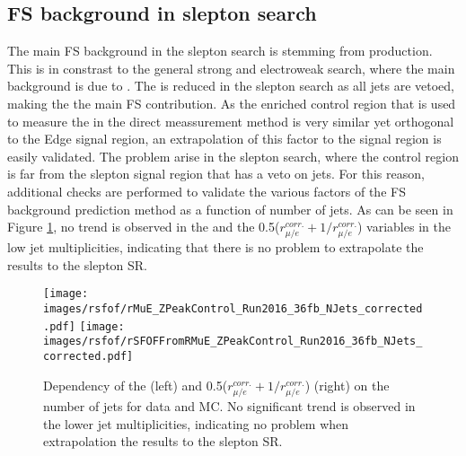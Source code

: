 \subsection{FS background in slepton search}
The main FS background in the slepton search is stemming from \PWW production. 
This is in constrast to the general strong and electroweak search, where the main background is due to \ttbar. 
The \ttbar is reduced in the slepton search as all jets are vetoed, making the \PWW the main FS contribution. 
As the \ttbar enriched control region that is used to measure the \Rsfof in the direct meassurement method is very similar yet orthogonal to the Edge signal region, an extrapolation of this factor to the signal region is easily validated. 
The problem arise in the slepton search, where the \ttbar control region is far from the slepton signal region that has a veto on jets. 
For this reason, additional checks are performed to validate the various factors of the FS background prediction method as a function of number of jets. 
As can be seen in Figure \ref{fig:rmueSlepton}, no trend is observed in the \rmue and the 0.5($r_{\mu/e}^{corr.}+1/r_{\mu/e}^{corr.}$) variables in the low jet multiplicities, indicating that there is no problem to extrapolate the results to the slepton SR. 
\begin{figure}[htbp!]
\begin{center}
    \texttt{[image: images/rsfof/rMuE\_ZPeakControl\_Run2016\_36fb\_NJets\_corrected.pdf]}
    \texttt{[image: images/rsfof/rSFOFFromRMuE\_ZPeakControl\_Run2016\_36fb\_NJets\_corrected.pdf]}
    \caption{Dependency of the \rmue (left) and 0.5($r_{\mu/e}^{corr.}+1/r_{\mu/e}^{corr.}$) (right) on the number of jets for data and MC. No significant trend is observed in the lower jet multiplicities, indicating no problem when extrapolation the results to the slepton SR.}
\label{fig:rmueSlepton}
\end{center}
\end{figure}
                                                                                                                                                                              
